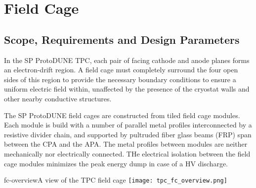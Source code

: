 



\section{Field Cage}

\subsection{Scope, Requirements and Design Parameters}

In the SP ProtoDUNE TPC, each pair of facing cathode and anode planes forms an
electron-drift region. A field cage must completely surround the four
open sides of this region to provide the necessary boundary conditions
to ensure a uniform electric field within, unaffected by the presence
of the cryostat walls and other nearby conductive structures.

The SP ProtoDUNE field cages are
constructed from tiled field cage modules.  Each module is build with a number of parallel metal profiles interconnected by a resistive divider chain, and supported by pultruded fiber glass beams (FRP) span between the CPA and the APA. The metal profiles between modules are neither mechanically nor electrically connected. THe electrical isolation between the field cage modules minimizes the peak energy dump in case of a HV discharge.


\begin{cdrfigure}{fc-overview}{A view of the TPC field cage}
\texttt{[image: tpc\_fc\_overview.png]}
\end{cdrfigure}


